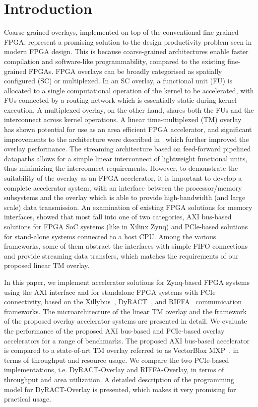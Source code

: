 \section{Introduction}
Coarse-grained overlays, implemented on top of the conventional fine-grained FPGA, represent a promising solution to the design productivity problem seen in modern FPGA design. This is because coarse-grained architectures enable faster compilation and software-like programmability, compared to the existing fine-grained FPGAs.  
FPGA overlays can be broadly categorised as spatially configured (SC) or multiplexed. In an SC overlay, a functional unit (FU) is allocated to a single computational operation of the kernel to be accelerated, with FUs connected by a routing network which is essentially static during kernel execution. A multiplexed overlay, on the other hand, shares both the FUs and the interconnect across kernel operations.
A linear time-multiplexed (TM) overlay~\cite{li2016area} has shown potential for use as an area efficient FPGA accelerator, and significant improvements to the architecture were described in~\cite{li2018time} which further improved the overlay performance. 
The streaming architecture based on feed-forward pipelined datapaths allows for a simple linear interconnect of lightweight functional units, thus minimizing the interconnect requirements. 
However, to demonstrate the suitability of the overlay as an FPGA accelerator, it is important to develop a complete accelerator system, with an interface between the processor/memory subsystems and the overlay which is able to provide high-bandwidth (and large scale) data transmission.
An examination of existing FPGA solutions for memory interfaces, showed that most fall into one of two categories, AXI bus-based solutions for FPGA SoC systems (like in Xilinx Zynq) and PCle-based solutions for stand-alone systems connected to a host CPU. 
Among the various frameworks, some of them abstract the interfaces with simple FIFO connections and provide streaming data transfers, which matches the requirements of our proposed linear TM overlay. 

In this paper, we implement accelerator solutions for Zynq-based FPGA systems using the AXI interface and for standalone FPGA systems with PCIe connectivity, based on the Xillybus~\cite{xillybus2018}, DyRACT~\cite{vipin2014dyract}, and RIFFA~\cite{jacobsen2015riffa} communication frameworks. 
The microarchitecture of the linear TM overlay and the framework of the proposed overlay accelerator systems are presented in detail. 
We evaluate the performance of the proposed AXI bus-based and PCIe-based overlay accelerators for a range of benchmarks. 
The proposed AXI bus-based accelerator is compared to a state-of-art TM overlay referred to as VectorBlox MXP~\cite{severance2013embedded}, in terms of throughput and resource usage. 
We compare the two PCIe-based implementations, i.e. DyRACT-Overlay and RIFFA-Overlay, in terms of throughput and area utilization. 
A detailed description of the programming model for DyRACT-Overlay is presented, which makes it very promising for practical usage.


